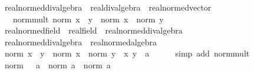 \begin{isabellebody}
%
\isadelimproof
\isanewline
%
\endisadelimproof
\isanewline
{}\isamarkupfalse%
\ real{\isacharunderscore}{\kern0pt}normed{\isacharunderscore}{\kern0pt}div{\isacharunderscore}{\kern0pt}algebra\ {\isacharequal}{\kern0pt}\ real{\isacharunderscore}{\kern0pt}div{\isacharunderscore}{\kern0pt}algebra\ {\isacharplus}{\kern0pt}\ real{\isacharunderscore}{\kern0pt}normed{\isacharunderscore}{\kern0pt}vector\ {\isacharplus}{\kern0pt}\isanewline
\ \ \ norm{\isacharunderscore}{\kern0pt}mult{\isacharcolon}{\kern0pt}\ {\isachardoublequoteopen}norm\ {\isacharparenleft}{\kern0pt}x\ {\isacharasterisk}{\kern0pt}\ y{\isacharparenright}{\kern0pt}\ {\isacharequal}{\kern0pt}\ norm\ x\ {\isacharasterisk}{\kern0pt}\ norm\ y{\isachardoublequoteclose}\isanewline
\isanewline
{}\isamarkupfalse%
\ real{\isacharunderscore}{\kern0pt}normed{\isacharunderscore}{\kern0pt}field\ {\isacharequal}{\kern0pt}\ real{\isacharunderscore}{\kern0pt}field\ {\isacharplus}{\kern0pt}\ real{\isacharunderscore}{\kern0pt}normed{\isacharunderscore}{\kern0pt}div{\isacharunderscore}{\kern0pt}algebra\isanewline
\isanewline
{}\isamarkupfalse%
\ real{\isacharunderscore}{\kern0pt}normed{\isacharunderscore}{\kern0pt}div{\isacharunderscore}{\kern0pt}algebra\ {\isacharless}{\kern0pt}\ real{\isacharunderscore}{\kern0pt}normed{\isacharunderscore}{\kern0pt}algebra{\isacharunderscore}{\kern0pt}{}\isanewline
%
\isadelimproof
%
\endisadelimproof
%
\isatagproof
{}\isamarkupfalse%
\isanewline
\ \ \isamarkupfalse%
\ {\isachardoublequoteopen}norm\ {\isacharparenleft}{\kern0pt}x\ {\isacharasterisk}{\kern0pt}\ y{\isacharparenright}{\kern0pt}\ {\isasymle}\ norm\ x\ {\isacharasterisk}{\kern0pt}\ norm\ y{\isachardoublequoteclose}\ \ x\ y\ {\isacharcolon}{\kern0pt}{\isacharcolon}{\kern0pt}\ {\isacharprime}{\kern0pt}a\isanewline
\ \ \ \ \isamarkupfalse%
\ {\isacharparenleft}{\kern0pt}simp\ add{\isacharcolon}{\kern0pt}\ norm{\isacharunderscore}{\kern0pt}mult{\isacharparenright}{\kern0pt}\isanewline
{}\isamarkupfalse%
\isanewline
\ \ \isamarkupfalse%
\ {\isachardoublequoteopen}norm\ {\isacharparenleft}{\kern0pt}{}\ {\isacharasterisk}{\kern0pt}\ {}{\isacharcolon}{\kern0pt}{\isacharcolon}{\kern0pt}{\isacharprime}{\kern0pt}a{\isacharparenright}{\kern0pt}\ {\isacharequal}{\kern0pt}\ norm\ {\isacharparenleft}{\kern0pt}{}{\isacharcolon}{\kern0pt}{\isacharcolon}{\kern0pt}{\isacharprime}{\kern0pt}a{\isacharparenright}{\kern0pt}\ {\isacharasterisk}{\kern0pt}\ norm\ {\isacharparenleft}{\kern0pt}{}{\isacharcolon}{\kern0pt}{\isacharcolon}{\kern0pt}{\isacharprime}{\kern0pt}a{\isacharparenright}{\kern0pt}{\isachardoublequoteclose}\isanewline

\end{isabellebody}
